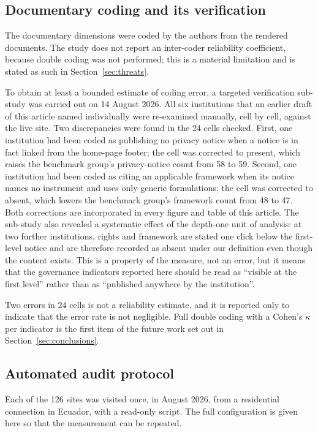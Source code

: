 \documentclass[pdflatex,sn-basic,Numbered]{sn-jnl}
\theoremstyle{thmstyleone}
\theoremstyle{thmstyletwo}
\theoremstyle{thmstylethree}
\begin{document}
\subsection{Documentary coding and its verification}\label{sec:methods-coding}

The documentary dimensions were coded by the authors from the rendered documents. The study does not report an inter-coder reliability coefficient, because double coding was not performed; this is a material limitation and is stated as such in Section~\ref{sec:threats}.

To obtain at least a bounded estimate of coding error, a targeted verification sub-study was carried out on 14 August 2026. All six institutions that an earlier draft of this article named individually were re-examined manually, cell by cell, against the live site. Two discrepancies were found in the 24 cells checked. First, one institution had been coded as publishing no privacy notice when a notice is in fact linked from the home-page footer; the cell was corrected to present, which raises the benchmark group's privacy-notice count from 58 to 59. Second, one institution had been coded as citing an applicable framework when its notice names no instrument and uses only generic formulations; the cell was corrected to absent, which lowers the benchmark group's framework count from 48 to 47. Both corrections are incorporated in every figure and table of this article. The sub-study also revealed a systematic effect of the depth-one unit of analysis: at two further institutions, rights and framework are stated one click below the first-level notice and are therefore recorded as absent under our definition even though the content exists. This is a property of the measure, not an error, but it means that the governance indicators reported here should be read as ``visible at the first level'' rather than as ``published anywhere by the institution''.

Two errors in 24 cells is not a reliability estimate, and it is reported only to indicate that the error rate is not negligible. Full double coding with a Cohen's $\kappa$ per indicator is the first item of the future work set out in Section~\ref{sec:conclusions}.

\subsection{Automated audit protocol}\label{sec:methods-audit}

Each of the 126 sites was visited once, in August 2026, from a residential connection in Ecuador, with a read-only script. The full configuration is given here so that the measurement can be repeated.
\end{document}
